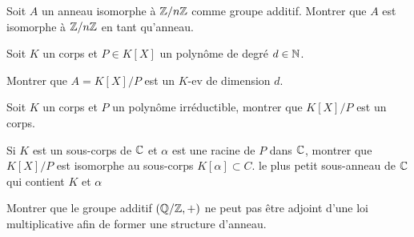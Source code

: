 \documentclass{report}
\begin{document}
\begin{exo}
    Soit \(A\) un anneau isomorphe à \(\mathbb{Z}/n\mathbb{Z}\) comme groupe additif. Montrer que
    \(A\) est isomorphe à \(\mathbb{Z}/n\mathbb{Z}\) en tant qu'anneau.
\end{exo}

\begin{exo}
    Soit \(K\) un corps et \(P\in K[X]\) un polynôme de degré \(d\in\mathbb{N}\).
    \begin{q}{1}
        Montrer que \(A=K[X]/P\) est un \(K\)-ev de dimension \(d\).
    \end{q}
    \begin{q}{2}
        Soit \(K\) un corps et \(P\) un polynôme irréductible, montrer que \(K[X]/P\)
        est un corps.
    \end{q}
    \begin{q}{3}
        Si \(K\) est un sous-corps de \(\mathbb{C}\) et \(\alpha\) est une racine de \(P\)
        dans \(\mathbb{C}\), montrer que \(K[X]/P\) est isomorphe au sous-corps \(K[\alpha]\subset C\).
        le plus petit sous-anneau de \(\mathbb{C}\) qui contient \(K\) et \(\alpha\)
    \end{q}
\end{exo}

\begin{exo}
    Montrer que le groupe additif \(\left(\mathbb{Q}/\mathbb{Z},+\right)\) ne peut pas être
    adjoint d'une loi multiplicative afin de former une structure d'anneau.
\end{exo}
\end{document}
